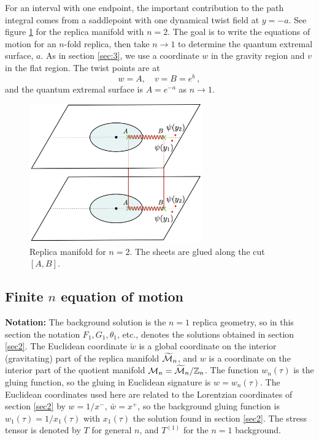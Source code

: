 \documentclass[11pt,oneside,letterpaper]{article}
\newcommand{\be}{\begin{equation}}
\newcommand{\ee}{\end{equation}}
\def\be{\begin{eqnarray}}
\def\ee{\end{eqnarray}}
\def\be{\begin{equation}}
\def\ee{\end{equation}}
\numberwithin{equation}{section}
\def\be{\begin{equation}}
\def\ee{\end{equation}}
\def \be {\begin{equation}}
\def \ee {\end{equation}}
\begin{document}
\begin{spacing}{1.1}
For an interval with one endpoint, the important contribution to the path integral comes from a saddlepoint with one dynamical twist field at $y=-a$. See figure \ref{fig:replicasetup} for the replica manifold with $n=2$. The goal is to write the equations of motion for an $n$-fold replica, then take $n \to 1$ to determine the quantum extremal surface, $a$. As in section \ref{sec:3}, we use a coordinate $w$ in the gravity region and $v$ in the flat region. The twist points are at
\be
w = A , \quad v = B = e^{b} \ ,
\ee
and the quantum extremal surface is $A = e^{-a}$ as $n \to 1$.

\begin{figure}
   \begin{center}
  \includegraphics[height=6cm]{figures/replicasetup2.png}
  \caption{
Replica manifold for $n=2$. The sheets are glued along the cut $[A,B]$.
  \label{fig:replicasetup}
  }
  \end{center}
\end{figure}




\subsection{Finite $n$ equation of motion}

 \textbf{Notation:} The background solution is the $n=1$ replica geometry, so in this section the notation $F_1, G_1, \theta_1$, etc., denotes the solutions obtained in section \ref{sec2}. The Euclidean coordinate $\tilde{w}$ is a global coordinate on the interior (gravitating) part of the replica manifold $\widetilde{{\cal M}}_n$, and $w$ is a coordinate on the interior part of the quotient manifold ${\cal M}_n =\widetilde{{\cal M}}_n/ \mathbb{Z}_n$. The function $w_n(\tau)$ is the gluing function, so the gluing in Euclidean signature is $w = w_n(\tau)$. The Euclidean coordinates used here are related to the Lorentzian coordinates of section \ref{sec2} by $w = 1/x^-$, $\bar{w} = x^+$, so the background gluing function is $w_1(\tau) = 1/x_1(\tau)$ with $x_1(\tau)$ the solution found in section \ref{sec2}. The stress tensor is denoted by $T$ for general $n$, and $T^{(1)}$ for the $n=1$ background.
 

\end{spacing}
\end{document}

